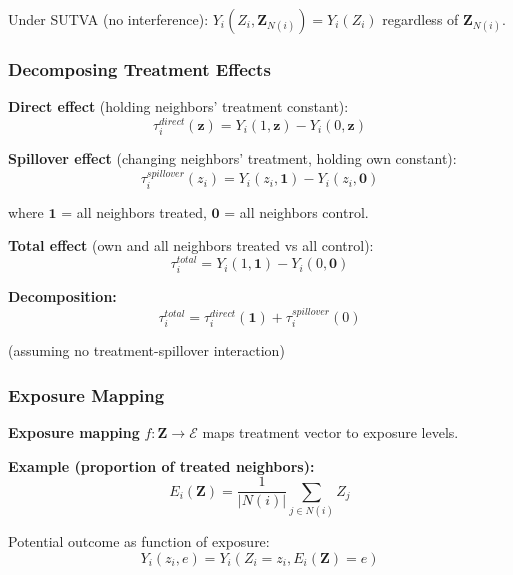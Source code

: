 Under SUTVA (no interference): $Y_i(Z_i, \mathbf{Z}_{N(i)}) = Y_i(Z_i)$ regardless of $\mathbf{Z}_{N(i)}$.

\subsubsection{Decomposing Treatment Effects}

\textbf{Direct effect} (holding neighbors' treatment constant):
\begin{equation}
\tau_i^{direct}(\mathbf{z}) = Y_i(1, \mathbf{z}) - Y_i(0, \mathbf{z})
\end{equation}

\textbf{Spillover effect} (changing neighbors' treatment, holding own constant):
\begin{equation}
\tau_i^{spillover}(z_i) = Y_i(z_i, \mathbf{1}) - Y_i(z_i, \mathbf{0})
\end{equation}

where $\mathbf{1}$ = all neighbors treated, $\mathbf{0}$ = all neighbors control.

\textbf{Total effect} (own and all neighbors treated vs all control):
\begin{equation}
\tau_i^{total} = Y_i(1, \mathbf{1}) - Y_i(0, \mathbf{0})
\end{equation}

\textbf{Decomposition:}
\begin{equation}
\tau_i^{total} = \tau_i^{direct}(\mathbf{1}) + \tau_i^{spillover}(0)
\end{equation}

(assuming no treatment-spillover interaction)

\subsubsection{Exposure Mapping}

\textbf{Exposure mapping} $f: \mathbf{Z} \to \mathcal{E}$ maps treatment vector to exposure levels.

\textbf{Example (proportion of treated neighbors):}
\begin{equation}
E_i(\mathbf{Z}) = \frac{1}{|N(i)|} \sum_{j \in N(i)} Z_j
\end{equation}

Potential outcome as function of exposure:
\begin{equation}
Y_i(z_i, e) = Y_i(Z_i = z_i, E_i(\mathbf{Z}) = e)
\end{equation}

